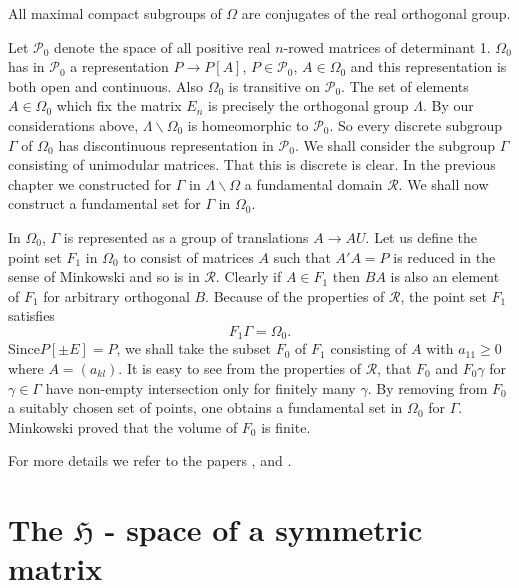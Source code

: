 \begin{thm}\label{chap3:thm2}
All maximal compact subgroups of $\Omega$ are conjugates of the real
orthogonal group.
\end{thm}

Let $\mathscr{P}_{0}$ denote the space of all positive real $n$-rowed
matrices of determinant 1. $\Omega_{0}$ has in $\mathscr{P}_{0}$ a
representation $P\to 
P[A]$, $P\in\mathscr{P}_{0}$, $A\in\Omega_{0}$ and this representation
is both open and continuous. Also $\Omega_{0}$ is transitive on
$\mathscr{P}_{0}$. The set of elements $A\in\Omega_{0}$ which fix the
matrix $E_{n}$ is precisely the orthogonal group $\Lambda$. By our
considerations above, $\Lambda\backslash\Omega_{0}$ is homeomorphic to
$\mathscr{P}_{0}$. So every discrete subgroup $\Gamma$ of $\Omega_{0}$
has discontinuous representation in $\mathscr{P}_{0}$. We shall
consider the subgroup $\Gamma$ consisting of unimodular matrices. That
this is discrete is clear. In the previous chapter we constructed for
$\Gamma$ in $\Lambda\backslash\Omega$ a fundamental domain
$\mathscr{R}$. We shall now construct a fundamental set for $\Gamma$
in $\Omega_{0}$.

In $\Omega_{0}$, $\Gamma$ is represented as a group of translations
$A\to AU$. Let us define the point set $F_{1}$ in $\Omega_{0}$ to
consist of matrices $A$ such that $A'A=P$ is reduced in the sense of
Minkowski and so is in $\mathscr{R}$. Clearly if $A\in F_{1}$ then
$BA$ is also an element of $F_{1}$ for arbitrary orthogonal
$B$. Because of the properties of $\mathscr{R}$, the point set $F_{1}$
satisfies
$$
F_{1}\Gamma=\Omega_{0}.
$$
Since\pageoriginale $P[\pm E]=P$, we shall take the subset $F_{0}$ of
$F_{1}$ consisting of $A$ with $a_{11}\geq 0$ where $A=(a_{kl})$. It
is easy to see from the properties of $\mathscr{R}$, that $F_{0}$ and
$F_{0}\gamma$ for $\gamma\in\Gamma$ have non-empty intersection only
for finitely many $\gamma$. By removing from $F_{0}$ a suitably chosen
set of points, one obtains a fundamental set in $\Omega_{0}$ for
$\Gamma$. Minkowski proved that the volume of $F_{0}$ is finite.

For more details we refer to the papers \cite{c3:key6}, \cite{c3:key7} and
\cite{c3:key8}.


\section{The \texorpdfstring{$\mathfrak{H}$}{H} - space of a symmetric matrix}\label{chap3:sec2} 

